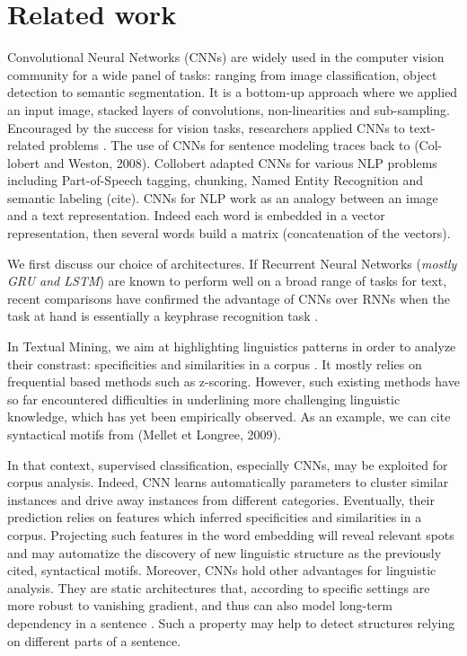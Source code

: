 \section{Related work}

Convolutional Neural Networks (CNNs) are widely used in the computer vision community for a wide panel of tasks: ranging from image classification, 
object detection to semantic segmentation. It is a bottom-up approach where we applied an input image, stacked layers of convolutions, non-linearities and sub-sampling.
Encouraged by the success for vision tasks, researchers applied CNNs to text-related problems \cite{kalchbrenner2014convolutional, kim2014convolutional}. The use of CNNs for sentence modeling traces back to (Col-
lobert and Weston, 2008). Collobert adapted 
CNNs for various NLP problems including Part-of-Speech tagging, chunking, Named Entity Recognition and semantic labeling (cite). 
CNNs for NLP work as an analogy between an image and a text representation. Indeed each word is embedded in a vector representation, then several words build a matrix (concatenation of the vectors). 


We first discuss our choice of architectures. 
If Recurrent Neural Networks (\textit{mostly GRU and LSTM}) are known to perform well on a broad range of tasks for text, recent comparisons have confirmed the advantage of CNNs 
over RNNs when the task at hand is essentially a keyphrase recognition task \cite{yin2017comparative}. 

In Textual Mining, we aim at highlighting linguistics patterns in order to analyze their constrast: specificities and similarities in a corpus \cite{Aho:72}. It mostly relies on frequential based methods such as z-scoring. However, such existing methods have so far encountered difficulties in underlining more challenging linguistic knowledge, which has yet been empirically observed.  As an example, we can cite syntactical motifs from (Mellet et Longree, 2009).

In that context, supervised classification, especially CNNs, may be exploited for corpus analysis. Indeed, CNN learns automatically parameters to cluster similar instances and drive away instances from different categories. Eventually, their prediction relies on features which inferred specificities and similarities in a corpus. Projecting such features in the word embedding will reveal relevant spots and may automatize the discovery of new linguistic structure as the previously cited, syntactical motifs. Moreover, CNNs hold other advantages for linguistic analysis. They are static architectures that, according to specific settings are more robust to vanishing gradient, 
and thus can also model long-term dependency in a sentence \cite{dauphin2017language,wen2017network, adel2017global}. Such a property may help to detect structures relying on different parts of a sentence.

